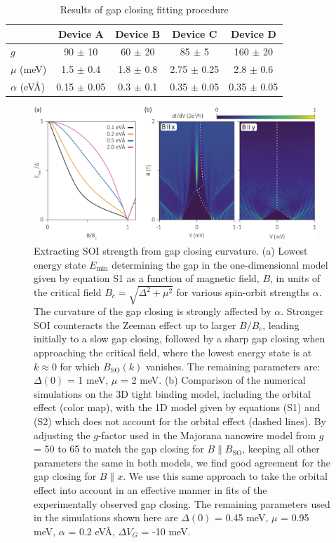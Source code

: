 \begin{table}[h]
\label{tab:AlphaFit}
\caption{Results of gap closing fitting procedure}
\begin{tabular}{l|cccc}
& Device A & Device B & Device C & Device D \\
\hline 
$g$ & 90 $\pm$ 10 & 60 $\pm$ 20 & 85 $\pm$ 5 & 160 $\pm$ 20\\
$\mu$ (meV) & 1.5 $\pm$ 0.4 & 1.8 $\pm$ 0.8 & 2.75 $\pm$ 0.25 & 2.8 $\pm$ 0.6\\
$\alpha$ (eV\AA) & 0.15 $\pm$ 0.05 & 0.3 $\pm$ 0.1 & 0.35 $\pm$ 0.05 & 0.35 $\pm$ 0.05\\
\end{tabular}
\end{table}

\begin{figure}
\centering
\includegraphics[width=0.95\textwidth]{chapter_spinorbit/figures/SFig7_AlphaFitting.pdf}
\caption{\label{fig:SOIFit}
Extracting SOI strength from gap closing curvature.
(a) Lowest energy state $E_{\mathrm{min}}$ determining the gap in the one-dimensional model given by equation S1 as a function of magnetic field, $B$, in units of the critical field $B_c=\sqrt{\Delta^2+\mu^2}$ for various spin-orbit strengths $\alpha$.
The curvature of the gap closing is strongly affected by $\alpha$.
Stronger SOI counteracts the Zeeman effect up to larger $B/B_c$, leading initially to a slow gap closing, followed by a sharp gap closing when approaching the critical field, where the lowest energy state is at $k \approx 0$ for which $B_{\mathrm{SO}}(k)$ vanishes.
The remaining parameters are: $\Delta(0)$ = 1 meV, $\mu$ = 2 meV.
(b) Comparison of the numerical simulations on the 3D tight binding model, including the orbital effect (color map), with the 1D model given by equations (S1) and (S2) which does not account for the orbital effect (dashed lines).
By adjusting the $g$-factor used in the Majorana nanowire model from $g$ = 50 to 65 to match the gap closing for $B \parallel B_{\mathrm{SO}}$, keeping all other parameters the same in both models, we find good agreement for the gap closing for $B \parallel x$.
We use this same approach to take the orbital effect into account in an effective manner in fits of the experimentally observed gap closing.
The remaining parameters used in the simulations shown here are $\Delta(0)$ = 0.45 meV, $\mu$ = 0.95 meV, $\alpha$ = 0.2 eV\AA, $\Delta V_G$ = -10 meV.
}
\end{figure}

